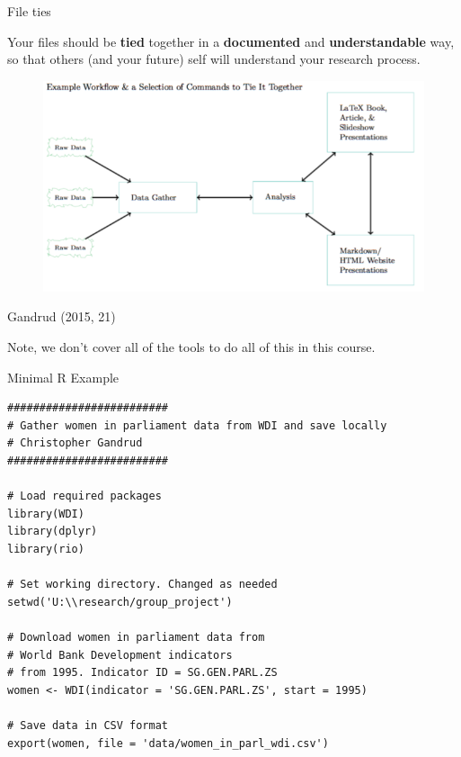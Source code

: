 \documentclass[10pt]{beamer}
\begin{document}
\begin{frame}{File ties}

    Your files should be \textbf{tied} together in a \textbf{documented} and \textbf{understandable} way, so that others (and your future) self will understand your research process.

\end{frame}

\begin{frame}

    \begin{figure}
        \includegraphics[scale=0.35]{img/workflow.png}
    \end{figure}
{\tiny{Gandrud (2015, 21)}}


Note, we don't cover all of the tools to do all of this in this course.
\end{frame}


\begin{frame}[fragile]{Minimal R Example}

\begin{lstlisting}
#########################
# Gather women in parliament data from WDI and save locally
# Christopher Gandrud
#########################

# Load required packages
library(WDI)
library(dplyr)
library(rio)

# Set working directory. Changed as needed
setwd('U:\\research/group_project')

# Download women in parliament data from
# World Bank Development indicators
# from 1995. Indicator ID = SG.GEN.PARL.ZS
women <- WDI(indicator = 'SG.GEN.PARL.ZS', start = 1995)

# Save data in CSV format
export(women, file = 'data/women_in_parl_wdi.csv')
\end{lstlisting}

\end{frame}
\end{document}
